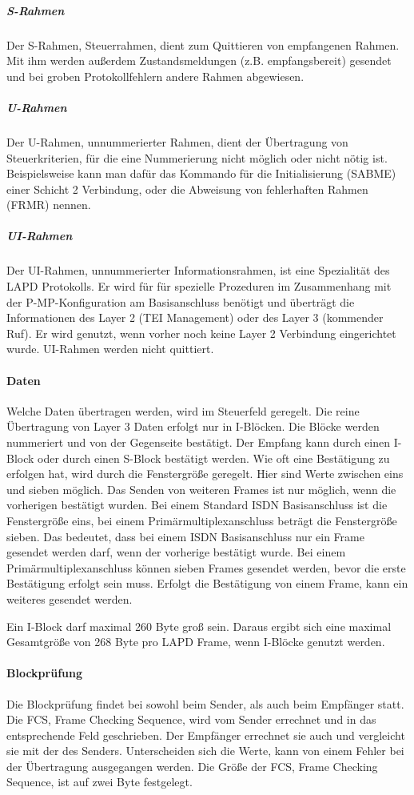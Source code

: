 \documentclass[12pt, a4paper, ngerman]{article}
\newcommand{\fcs}{FCS, Frame Checking Sequence,\xspace}
\begin{document}
\subparagraph{S-Rahmen}
Der S-Rahmen, Steuerrahmen, dient zum Quittieren von empfangenen Rahmen. Mit ihm werden außerdem Zustandsmeldungen (z.B. empfangsbereit) gesendet und bei groben Protokollfehlern andere Rahmen abgewiesen.

\subparagraph{U-Rahmen}
Der U-Rahmen, unnummerierter Rahmen, dient der Übertragung von Steuerkriterien, für die eine Nummerierung nicht möglich oder nicht nötig ist. Beispielsweise kann man dafür das Kommando für die Initialisierung (SABME) einer Schicht 2 Verbindung, oder die Abweisung von fehlerhaften Rahmen (FRMR) nennen.

\subparagraph{UI-Rahmen}
Der UI-Rahmen, unnummerierter Informationsrahmen, ist eine Spezialität des LAPD Protokolls. Er wird für für spezielle Prozeduren im Zusammenhang mit der P-MP-Konfiguration am Basisanschluss benötigt und überträgt die Informationen des Layer 2 (TEI Management) oder des Layer 3 (kommender Ruf). Er wird genutzt, wenn vorher noch keine Layer 2 Verbindung eingerichtet wurde. UI-Rahmen werden nicht quittiert.

\paragraph{Daten}
Welche Daten übertragen werden, wird im Steuerfeld geregelt. Die reine Übertragung von Layer 3 Daten erfolgt nur in I-Blöcken. Die Blöcke werden nummeriert und von der Gegenseite bestätigt. Der Empfang kann durch einen I-Block oder durch einen S-Block bestätigt werden. Wie oft eine Bestätigung zu erfolgen hat, wird durch die Fenstergröße geregelt. Hier sind Werte zwischen eins und sieben möglich. Das Senden von weiteren Frames ist nur möglich, wenn die vorherigen bestätigt wurden. Bei einem Standard ISDN Basisanschluss ist die Fenstergröße eins, bei einem Primärmultiplexanschluss beträgt die Fenstergröße sieben. Das bedeutet, dass bei einem ISDN Basisanschluss nur ein Frame gesendet werden darf, wenn der vorherige bestätigt wurde. Bei einem Primärmultiplexanschluss können sieben Frames gesendet werden, bevor die erste Bestätigung erfolgt sein muss. Erfolgt die Bestätigung von einem Frame, kann ein weiteres gesendet werden.

Ein I-Block darf maximal 260 Byte groß sein. Daraus ergibt sich eine maximal Gesamtgröße von 268 Byte pro LAPD Frame, wenn I-Blöcke genutzt werden.

\paragraph{Blockprüfung}
Die Blockprüfung findet bei sowohl beim Sender, als auch beim Empfänger statt. Die \fcs wird vom Sender errechnet und in das entsprechende Feld geschrieben. Der Empfänger errechnet sie auch und vergleicht sie mit der des Senders. Unterscheiden sich die Werte, kann von einem Fehler bei der Übertragung ausgegangen werden. Die Größe der \fcs ist auf zwei Byte festgelegt.
 
\end{document}
